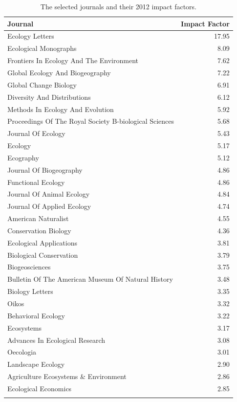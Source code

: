 \documentclass[12pt]{article}
\begin{document}
\vspace{-12pt}
\begin{longtable}{lr}
\caption{The selected journals and their 2012 impact factors.}\\
  \hline
\textbf{Journal} & \textbf{Impact Factor} \\
\hline
\endhead 
  \hline
Ecology Letters & 17.95 \\ 
  Ecological Monographs & 8.09 \\ 
  Frontiers In Ecology And The Environment & 7.62 \\ 
  Global Ecology And Biogeography & 7.22 \\ 
  Global Change Biology & 6.91 \\ 
  Diversity And Distributions & 6.12 \\ 
  Methods In Ecology And Evolution & 5.92 \\ 
  Proceedings Of The Royal Society B-biological Sciences & 5.68 \\ 
  Journal Of Ecology & 5.43 \\ 
  Ecology & 5.17 \\ 
  Ecography & 5.12 \\ 
  Journal Of Biogeography & 4.86 \\ 
  Functional Ecology & 4.86 \\ 
  Journal Of Animal Ecology & 4.84 \\ 
  Journal Of Applied Ecology & 4.74 \\ 
  American Naturalist & 4.55 \\ 
  Conservation Biology & 4.36 \\ 
  Ecological Applications & 3.81 \\ 
  Biological Conservation & 3.79 \\ 
  Biogeosciences & 3.75 \\ 
  Bulletin Of The American Museum Of Natural History & 3.48 \\ 
  Biology Letters & 3.35 \\ 
  Oikos & 3.32 \\ 
  Behavioral Ecology & 3.22 \\ 
  Ecosystems & 3.17 \\ 
  Advances In Ecological Research & 3.08 \\ 
  Oecologia & 3.01 \\ 
  Landscape Ecology & 2.90 \\ 
  Agriculture Ecosystems \& Environment & 2.86 \\ 
  Ecological Economics & 2.85 \\ 
   \hline
\label{tabs1}
\end{longtable}
\end{document}
